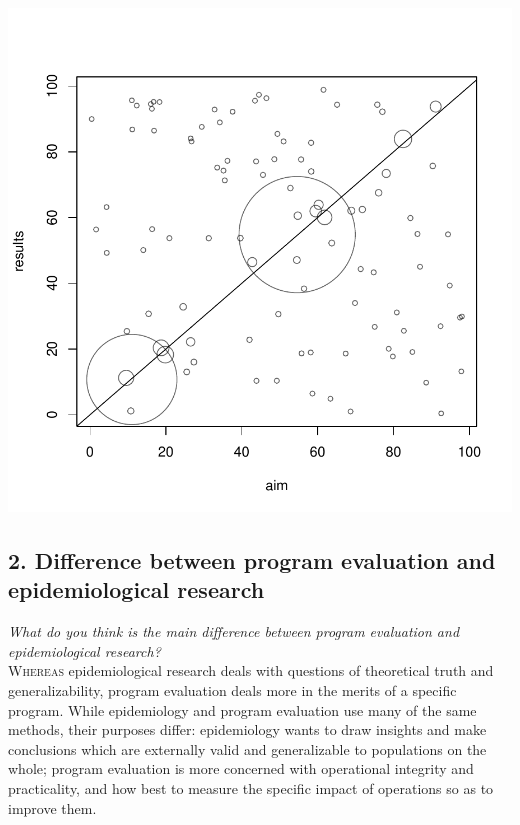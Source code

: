\documentclass[11pt]{article}
\begin{document}
\begin{multicols}{2}
\begin{center}
\includegraphics{hw5_brew-001}
\end{center}

\subsection*{2. Difference between program evaluation and epidemiological research}
\emph{What do you think is the main difference between program evaluation and epidemiological research?} \\
\lettrine[nindent=0em,lines=3]{W}{hereas} epidemiological research deals with questions of theoretical truth and generalizability, program evaluation deals more in the merits of a specific program.  While epidemiology and program evaluation use many of the same methods, their purposes differ: epidemiology wants to draw insights and make conclusions which are externally valid and generalizable to populations on the whole; program evaluation is more concerned with operational integrity and practicality, and how best to measure the specific impact of operations so as to improve them.  \\


\end{multicols}
\end{document}
